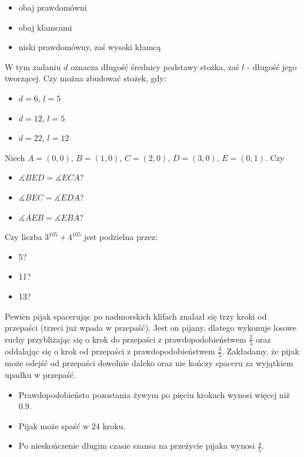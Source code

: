 \documentclass[12pt, a4paper]{article}
\newcommand{\question}[1]{\normalitem \begin{samepage}#1 \end{samepage}}
\newcommand{\questionwithasterix}[1]{ \asterixitem \begin{samepage}#1 \vspace{6cm}\end{samepage}}
\newcommand{\cmark}{\textcolor{green}{T}}%
\newcommand{\xmark}{\textcolor{red}{N}}%
\newcommand{\yes}{\rlap{\framebox(15,15)} {\raisebox{2pt}{\large\hspace{-1pt}\cmark}}%
\hspace{3pt}}
\newcommand{\no}{\rlap{\framebox(15,15)} {\raisebox{2pt}{\large\hspace{-1pt}\xmark}}%
\hspace{3pt}}
\begin{document}
\begin{enumerate}
{        \begin{itemize}
			\item [\no]obaj prawdomówni
			\item [\no]obaj kłamcami
			\item [\yes]niski prawdomówny, zaś wysoki kłamcą 
		\end{itemize}
	}
	
	\question {
		W tym zadaniu $d$ oznacza długość średnicy podstawy stożka, zaś $l$ - długość jego tworzącej. Czy można zbudować stożek, gdy:
		
		\begin{itemize}
			\item [\yes]$d = 6$, $l = 5$ 
			\item [\no]$d = 12$, $l = 5$
			\item [\yes]$d = 22$, $l = 12$
		\end{itemize}
	}
	
	\questionwithasterix{
		Niech $A=(0,0)$, $B=(1,0)$, $C=(2,0)$, $D=(3,0)$, $E=(0,1)$. Czy
	
		\begin{itemize}
			\item [\yes]$\measuredangle BED = \measuredangle ECA$?
			\item [\yes]$\measuredangle BEC = \measuredangle EDA$?
			\item [\yes]$\measuredangle AEB = \measuredangle EBA$?
		\end{itemize}
	}
	
	\question {
		Czy liczba $3^{105} + 4^{105}$ jest podzielna przez:
		
		\begin{itemize}
			\item [\no]5?
			\item [\no]11?
			\item [\yes]13?
		\end{itemize}
	}
	
	\question {
		Pewien pijak spacerując po nadmorskich klifach znalazł się trzy kroki od przepaści (trzeci już wpada w przepaść). Jest on pijany, dlatego wykonuje losowe ruchy przybliżając się o krok do przepaści z prawdopodobieństwem
        $\frac{2}{5}$ oraz oddalając się o krok od przepaści z prawdopodobieństwem $\frac{3}{5}$. Zakładamy, że pijak może odejść od przepaści dowolnie daleko oraz nie kończy spaceru za wyjątkiem upadku w przepaść.

		\begin{itemize}
			\item [\no]Prawdopodobieństo pozostania żywym po pięciu krokach wynosi więcej niż $0.9$.
			\item [\no]Pijak może spaść w $24$ kroku.
			\item [\no]Po nieskończenie długim czasie szansa na przeżycie pijaka wynosi $\frac{4}{5}$.
		\end{itemize}
	}
	

\end{enumerate}
\end{document}
